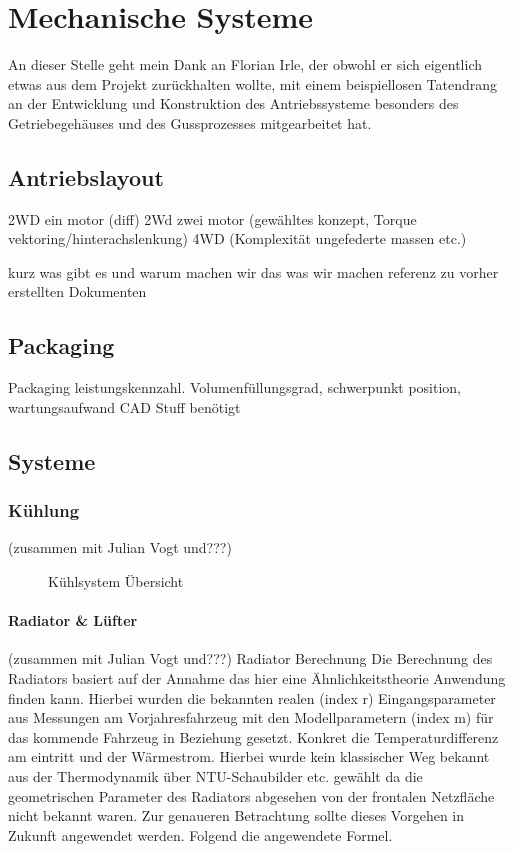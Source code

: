 
\chapter{Mechanische Systeme}
An dieser Stelle geht mein Dank an Florian Irle, der obwohl er sich eigentlich etwas aus dem Projekt zurückhalten wollte, mit einem beispiellosen Tatendrang an der Entwicklung und Konstruktion des Antriebssysteme besonders des Getriebegehäuses und des Gussprozesses mitgearbeitet hat.

\section{Antriebslayout}

2WD ein motor (diff)
2Wd zwei motor (gewähltes konzept, Torque vektoring/hinterachslenkung)
4WD (Komplexität ungefederte massen etc.)

kurz was gibt es und warum machen wir das was wir machen
referenz zu vorher erstellten Dokumenten

\section{Packaging}
Packaging leistungskennzahl. Volumenfüllungsgrad, schwerpunkt position, wartungsaufwand
CAD Stuff benötigt

\section{Systeme}

\subsection{Kühlung} (zusammen mit Julian Vogt und???)

\begin{figure}[H]
	\centering
	
	\caption{Kühlsystem Übersicht}
	\label{abb:Coolingssystem}
\end{figure}


\subsubsection{Radiator \& Lüfter} (zusammen mit Julian Vogt und???)
Radiator Berechnung
Die Berechnung des Radiators basiert auf der Annahme das hier eine Ähnlichkeitstheorie Anwendung finden kann. Hierbei wurden die bekannten realen (index r) Eingangsparameter aus Messungen am Vorjahresfahrzeug mit den Modellparametern (index m) für das kommende Fahrzeug in Beziehung gesetzt. Konkret die Temperaturdifferenz am eintritt und der Wärmestrom. Hierbei wurde kein klassischer Weg bekannt aus der Thermodynamik über NTU-Schaubilder etc. gewählt da die geometrischen Parameter des Radiators abgesehen von der frontalen Netzfläche nicht bekannt waren. Zur genaueren Betrachtung sollte dieses Vorgehen in Zukunft angewendet werden. Folgend die angewendete Formel.

